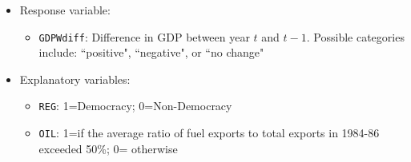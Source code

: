 \documentclass[12pt,letterpaper]{article}
\begin{document}
\begin{itemize}
	\item
	Response variable: 
	\begin{itemize}
		\item \texttt{GDPWdiff}: Difference in GDP between year $t$ and $t-1$. Possible categories include: ``positive", ``negative", or ``no change"
	\end{itemize}
	\item
	Explanatory variables: 
	\begin{itemize}
		\item
		\texttt{REG}: 1=Democracy; 0=Non-Democracy
		\item
		\texttt{OIL}: 1=if the average ratio of fuel exports to total exports in 1984-86 exceeded 50\%; 0= otherwise
	\end{itemize}
	
\end{itemize}
\end{document}
